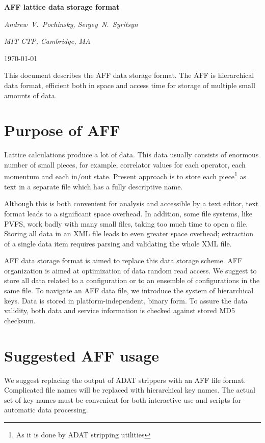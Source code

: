 \documentclass[10pt,letterpaper]{article}
\begin{document}
\centerline{\huge\bf AFF lattice data storage format}
\vspace{20pt}
\centerline{\it Andrew~V.~Pochinsky, Sergey~N.~Syritsyn}
\centerline{\it MIT CTP, Cambridge, MA}
\vspace{10pt}
\centerline{\today}
\vspace{20pt}

\noindent This document describes the AFF data storage format. 
The AFF is hierarchical data format, efficient both in space and access time 
for storage of multiple small amounts of data.

\newpage
\tableofcontents
\newpage

\section{Purpose of AFF}
Lattice calculations produce a lot of data. 
This data usually consists of enormous number of small pieces, for example, correlator values for
each operator, each momentum and each in/out state.
Present approach is to store each piece\footnote{As it is done by ADAT stripping utilities}
as text in a separate file which has a fully descriptive name. 

Although this is both convenient for analysis and accessible by a text editor, text format leads
to a significant space overhead. 
In addition, some file systems, like PVFS, work badly with
many small files, taking too much time to open a file. 
Storing all data in an XML file leads to even greater space overhead; extraction of a single
data item requires parsing and validating the whole XML file.

AFF data storage format is aimed to replace this data storage scheme. 
AFF organization is aimed at optimization of data random read access.
We suggest to store all data related to a configuration or to an ensemble of configurations in
the same file.
To navigate an AFF data file, we introduce the system of hierarchical keys.
Data is stored in platform-independent, binary form.
To assure the data validity, both data and service information is checked against stored
MD5 checksum.



\section{Suggested AFF usage}

We suggest replacing the output of ADAT strippers with an AFF file format. 
Complicated file names will be replaced with hierarchical key names. 
The actual set of key names must be convenient for both interactive use and 
scripts for automatic data processing.
\end{document}
